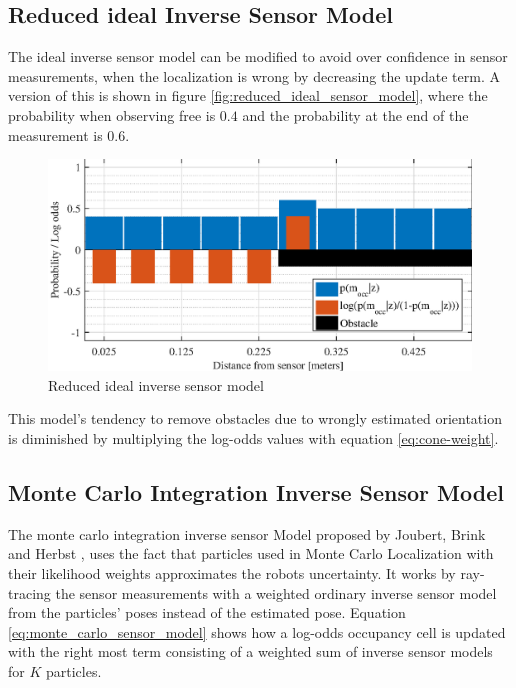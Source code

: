 \subsection{Reduced ideal Inverse Sensor Model}
\label{sec:reduced_ideal_sensor_model}
The ideal inverse sensor model can be modified to avoid over confidence in sensor measurements, when the localization is wrong by decreasing the update term. A version of this is shown in figure \vref{fig:reduced_ideal_sensor_model}, where the probability when observing free is $0.4$ and the probability at the end of the measurement is $0.6$. 
\begin{figure}[tbph]
	\centering
	\includegraphics[scale=1]{figures/static_mapping/reduced_ideal_sensor_model}
	\caption{Reduced ideal inverse sensor model}
	\label{fig:reduced_ideal_sensor_model}
\end{figure}
This model's tendency to remove obstacles due to wrongly estimated orientation is diminished by multiplying the log-odds values with equation \ref{eq:cone-weight}.

\subsection{Monte Carlo Integration Inverse Sensor Model}
\label{monte_carlo_sensor Model}
The monte carlo integration inverse sensor Model proposed by Joubert, Brink and Herbst \cite{Joubert2014},  uses the fact that particles used in Monte Carlo Localization with their likelihood weights approximates the robots uncertainty. 
It works by ray-tracing the sensor measurements with a weighted ordinary inverse sensor model from the particles' poses instead of the estimated pose. 
Equation \ref{eq:monte_carlo_sensor_model} shows how a log-odds occupancy cell is updated with the right most term consisting of a weighted sum of inverse sensor models for $K$ particles.

